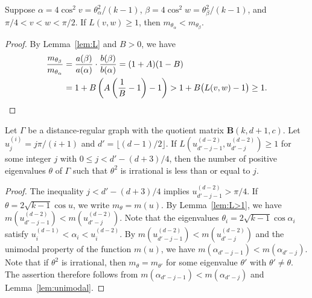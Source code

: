 \documentclass[ALCO,ThmDefs,Unicode,epreuves]{cedram}
\begin{document}

\begin{lemm} \label{lem:L>1}
Suppose $\alpha=4\cos^2 v=\theta_\alpha^2/(k-1)$, $\beta=4\cos^2 w=\theta_\beta^2/(k-1)$, and $\pi /4 < v < w < \pi /2$. 
If $L(v,w)\geq 1$, then $m_{\theta_\alpha}<m_{\theta_\beta}$. 
\end{lemm}
\begin{proof}
By Lemma~\ref{lem:L} and $B>0$, we have
\begin{align*}
\frac{m_{\theta_\beta}}{m_{\theta_\alpha}}&=\frac{a(\beta)}{a(\alpha)}\cdot \frac{b(\beta)}{b(\alpha)}=(1+A)(1-B)\\
&=1+B\left( A\left(\frac{1}{B}-1\right)-1\right)>1+B\big( L(v,w)-1\big)\geq 1. \qedhere
\end{align*}
\end{proof}

\begin{lemm}\label{lem:num_irr}
Let $\Gamma$ be a distance-regular graph with the quotient matrix $\boldsymbol{B} (k,d+1,c)$. 
Let $u_j^{(i)}=j \pi /(i+1)$ and $d'=\lfloor (d-1)/2 \rfloor$. 
If $L(u_{d'-j-1}^{(d-2)},u_{d'-j}^{(d-2)})\geq 1$ for some integer $j$ with $0 \leq j < d'-(d+3)/4$, 
then the number of positive eigenvalues $\theta$ of $\Gamma$ such that $\theta^2$ is irrational is less than or equal to $j$. 
\end{lemm}
\begin{proof}
The inequality $j < d'-(d+3)/4$ implies $u_{d'-j-1}^{(d-2)}>\pi/4$. 
If $\theta=2 \sqrt{k-1} \cos u$, we write $m_\theta=m(u)$. 
By Lemma~\ref{lem:L>1}, we have
$
m(u_{d'-j-1}^{(d-2)})<m(u_{d'-j}^{(d-2)})
$. 
Note that the eigenvalues $\theta_i=2 \sqrt{k-1} \cos \alpha_i$ satisfy 
 $u^{(d-1)}_{i}<\alpha_i< u^{(d-2)}_{i}$. 
By $
m(u_{d'-j-1}^{(d-2)})<m(u_{d'-j}^{(d-2)})
$ and the unimodal property of the function $m(u)$, we have $m(\alpha_{d'-j-1})<m(\alpha_{d'-j})$. 
Note that if $\theta^2$ is irrational, then $m_\theta=m_{\theta'}$ for some eigenvalue $\theta'$ with $\theta' \ne \theta$. 
The assertion therefore follows from $m(\alpha_{d'-j-1})<m(\alpha_{d'-j})$ and Lemma~\ref{lem:unimodal}. 
\end{proof}
\end{document}

